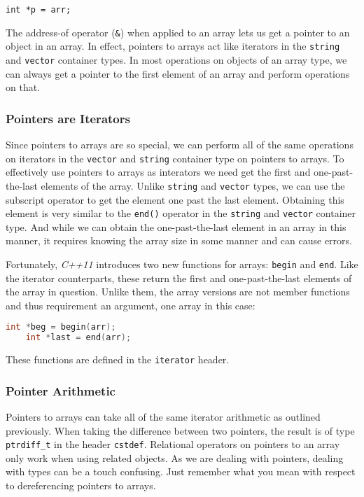 \documentclass[12pt, a4paper]{report}
\begin{document}
\verb|int *p = arr;|

The address-of operator (\verb|&|) when applied to an array lets us get a pointer to an object in an array.
In effect, pointers to arrays act like iterators in the \verb|string| and \verb|vector| container types.
In most operations on objects of an array type, we can always get a pointer to the first element of an array and perform operations on that.
\subsubsection{Pointers are Iterators}
Since pointers to arrays are so special, we can perform all of the same operations on iterators in the \verb|vector| and \verb|string| container type on pointers to arrays.
To effectively use pointers to arrays as interators we need get the first and one-past-the-last elements of the array.
Unlike \verb|string| and \verb|vector| types, we can use the subscript operator to get the element one past the last element.
Obtaining this element is very similar to the \verb|end()| operator in the \verb|string| and \verb|vector| container type.
And while we can obtain the one-past-the-last element in an array in this manner, it requires knowing the array size in some manner and can cause errors.

Fortunately, \emph{C++11} introduces two new functions for arrays: \verb|begin| and \verb|end|.
Like the iterator counterparts, these return the first and one-past-the-last elements of the array in question.
Unlike them, the array versions are not member functions and thus requirement an argument, one array in this case:

\begin{lstlisting}[language=C++]
	int *beg = begin(arr);
	int *last = end(arr);
\end{lstlisting}

These functions are defined in the \verb|iterator| header.

\subsubsection{Pointer Arithmetic}
Pointers to arrays can take all of the same iterator arithmetic as outlined previously.
When taking the difference between two pointers, the result is of type \verb|ptrdiff_t| in the header \verb|cstdef|.
Relational operators on pointers to an array only work when using related objects.
As we are dealing with pointers, dealing with types can be a touch confusing.
Just remember what you mean with respect to dereferencing pointers to arrays.
\end{document}
